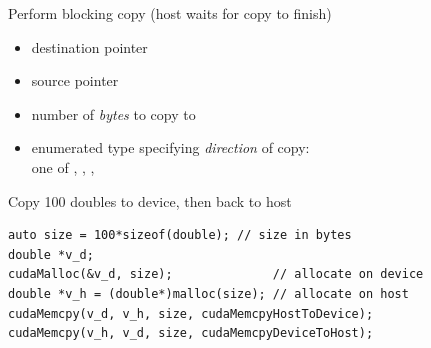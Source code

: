 \documentclass[aspectratio=43]{beamer}
\begin{document}
\begin{frame}[fragile]{}
    \begin{info}{Perform blocking copy (host waits for copy to finish)}
        \centering {}
    \begin{itemize}
        \item {} destination pointer
        \item {} source pointer
        \item {} number of \emph{bytes} to copy to 
        \item {} enumerated type specifying \emph{direction} of copy:
            \\ one of
            , , , 
    \end{itemize}
    \end{info}

    \begin{code}{Copy 100 doubles to device, then back to host}
        \begin{lstlisting}[style=boxcuda]
auto size = 100*sizeof(double); // size in bytes
double *v_d;
cudaMalloc(&v_d, size);              // allocate on device
double *v_h = (double*)malloc(size); // allocate on host
cudaMemcpy(v_d, v_h, size, cudaMemcpyHostToDevice);
cudaMemcpy(v_h, v_d, size, cudaMemcpyDeviceToHost);
\end{lstlisting}
    \end{code}
\end{frame}
\end{document}
